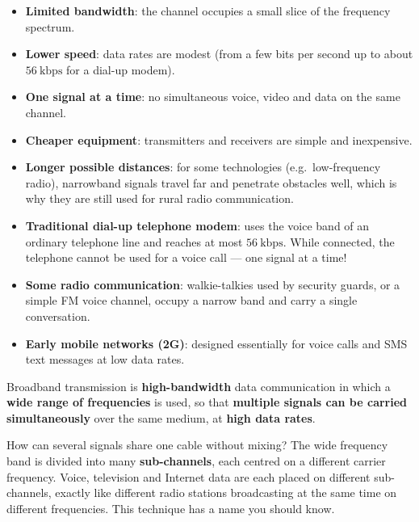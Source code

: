 \documentclass[11pt]{article}
\newcommand{\cle}[1]{{\popxbold\color{popdark}#1}}
\newcounter{popsec}
\newcounter{popsub}
\newcommand{\courssub}[1]{%
  \stepcounter{popsub}%
  \par\vspace{9pt}\noindent{\popxbold\fontsize{11.5}{13}\selectfont\color{popink}{\color{poporange}\thepopsec.\thepopsub}\hspace{6pt}#1}\par\nopagebreak\vspace{4pt}
}
\begin{document}
\begin{aretenir}
\begin{itemize}
\item \textbf{Limited bandwidth}: the channel occupies a small slice of the frequency spectrum.
\item \textbf{Lower speed}: data rates are modest (from a few bits per second up to about $56\ \mathrm{kbps}$ for a dial-up modem).
\item \textbf{One signal at a time}: no simultaneous voice, video and data on the same channel.
\item \textbf{Cheaper equipment}: transmitters and receivers are simple and inexpensive.
\item \textbf{Longer possible distances}: for some technologies (e.g.\ low-frequency radio), narrowband signals travel far and penetrate obstacles well, which is why they are still used for rural radio communication.
\end{itemize}
\end{aretenir}

\begin{exemplebox}
\begin{itemize}
\item \textbf{Traditional dial-up telephone modem}: uses the voice band of an ordinary telephone line and reaches at most $56\ \mathrm{kbps}$. While connected, the telephone cannot be used for a voice call --- one signal at a time!
\item \textbf{Some radio communication}: walkie-talkies used by security guards, or a simple FM voice channel, occupy a narrow band and carry a single conversation.
\item \textbf{Early mobile networks (2G)}: designed essentially for voice calls and SMS text messages at low data rates.
\end{itemize}
\end{exemplebox}

\courssub{Broadband Transmission}

\begin{definition}
\cle{Broadband transmission} is \textbf{high-bandwidth} data communication in which a \textbf{wide range of frequencies} is used, so that \textbf{multiple signals can be carried simultaneously} over the same medium, at \textbf{high data rates}.
\end{definition}

How can several signals share one cable without mixing? The wide frequency band is divided into many \textbf{sub-channels}, each centred on a different carrier frequency. Voice, television and Internet data are each placed on different sub-channels, exactly like different radio stations broadcasting at the same time on different frequencies. This technique has a name you should know.
\end{document}
